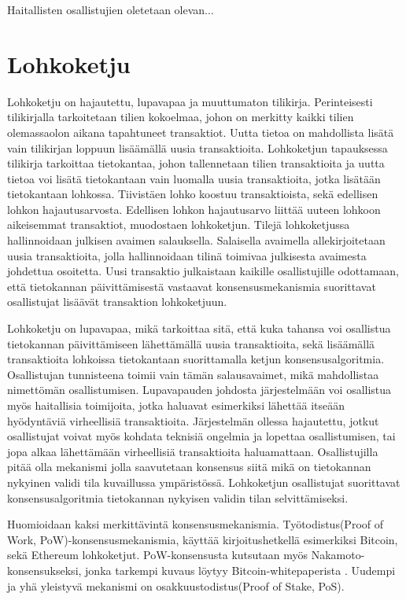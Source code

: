 Haitallisten osallistujien oletetaan olevan...

\section{Lohkoketju}

Lohkoketju on hajautettu, lupavapaa ja muuttumaton tilikirja. Perinteisesti tilikirjalla tarkoitetaan tilien kokoelmaa, johon on merkitty kaikki tilien olemassaolon aikana tapahtuneet transaktiot. Uutta tietoa on mahdollista lisätä vain tilikirjan loppuun lisäämällä uusia transaktioita. Lohkoketjun tapauksessa tilikirja tarkoittaa tietokantaa, johon tallennetaan tilien transaktioita ja uutta tietoa voi lisätä tietokantaan vain luomalla uusia transaktioita, jotka lisätään tietokantaan lohkossa. Tiivistäen lohko koostuu transaktioista, sekä edellisen lohkon hajautusarvosta. Edellisen lohkon hajautusarvo liittää uuteen lohkoon aikeisemmat transaktiot, muodostaen lohkoketjun. Tilejä lohkoketjussa hallinnoidaan julkisen avaimen salauksella. Salaisella avaimella allekirjoitetaan uusia transaktioita, jolla hallinnoidaan tilinä toimivaa julkisesta avaimesta johdettua osoitetta. Uusi transaktio julkaistaan kaikille osallistujille odottamaan, että tietokannan päivittämisestä vastaavat konsensusmekanismia suorittavat osallistujat lisäävät transaktion lohkoketjuun.

Lohkoketju on lupavapaa, mikä tarkoittaa sitä, että kuka tahansa voi osallistua tietokannan päivittämiseen lähettämällä uusia transaktioita, sekä lisäämällä transaktioita lohkoissa tietokantaan suorittamalla ketjun konsensusalgoritmia. Osallistujan tunnisteena toimii vain tämän salausavaimet, mikä mahdollistaa nimettömän osallistumisen. Lupavapauden johdosta järjestelmään voi osallistua myös haitallisia toimijoita, jotka haluavat esimerkiksi lähettää itseään hyödyntäviä virheellisiä transaktioita. Järjestelmän ollessa hajautettu, jotkut osallistujat voivat myös kohdata teknisiä ongelmia ja lopettaa osallistumisen, tai jopa alkaa lähettämään virheellisiä transaktioita haluamattaan. Osallistujilla pitää olla mekanismi jolla saavutetaan konsensus siitä mikä on tietokannan nykyinen validi tila kuvaillussa ympäristössä. Lohkoketjun osallistujat suorittavat konsensusalgoritmia tietokannan nykyisen validin tilan selvittämiseksi. 

Huomioidaan kaksi merkittävintä konsensusmekanismia. Työtodistus(Proof of Work, PoW)-konsensusmekanismia, käyttää kirjoitushetkellä esimerkiksi Bitcoin, sekä Ethereum lohkoketjut. PoW-konsensusta kutsutaan myös Nakamoto-konsensukseksi, jonka tarkempi kuvaus löytyy Bitcoin-whitepaperista \cite{Nakamoto_bitcoin}. Uudempi ja yhä yleistyvä mekanismi on  osakkuustodistus(Proof of Stake, PoS). 

